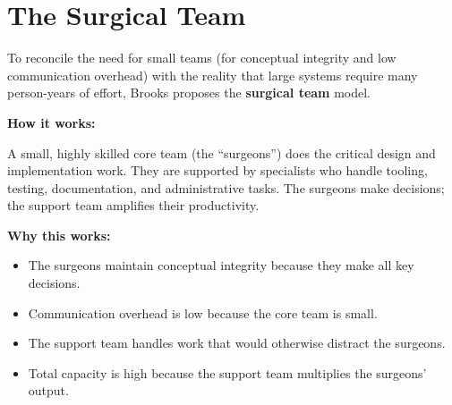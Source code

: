 \documentclass[11pt, letterpaper]{article}
\begin{document}
\vspace{1em}

\section*{The Surgical Team}

To reconcile the need for small teams (for conceptual integrity and low communication overhead) with the reality that large systems require many person-years of effort, Brooks proposes the \textbf{surgical team} model.

\textbf{How it works:}

A small, highly skilled core team (the ``surgeons'') does the critical design and implementation work. They are supported by specialists who handle tooling, testing, documentation, and administrative tasks. The surgeons make decisions; the support team amplifies their productivity.

\begin{center}
\end{center}

\textbf{Why this works:}

\begin{itemize}
    \item The surgeons maintain conceptual integrity because they make all key decisions.
    \item Communication overhead is low because the core team is small.
    \item The support team handles work that would otherwise distract the surgeons.
    \item Total capacity is high because the support team multiplies the surgeons' output.
\end{itemize}
\end{document}
